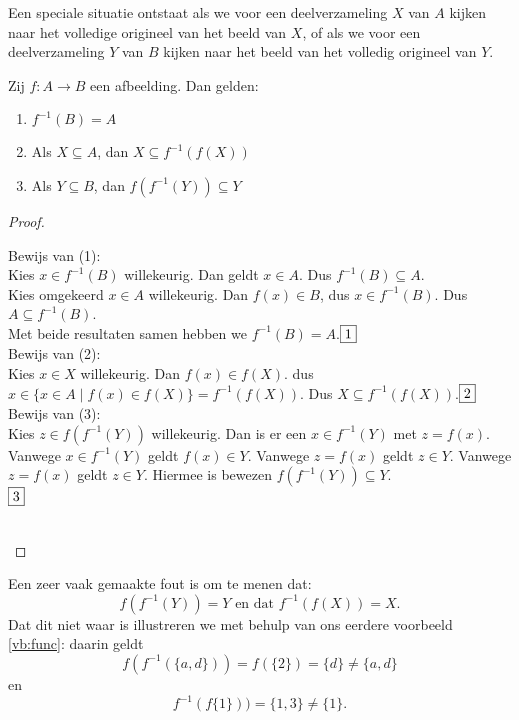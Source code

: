 Een speciale situatie ontstaat als we voor een deelverzameling $X$ van $A$ kijken naar het volledige origineel van het beeld van $X$, of als we voor een deelverzameling $Y$ van $B$ kijken naar het beeld van het volledig origineel van $Y$.
\begin{theorem}\label{st:afb}
Zij $f:A\rightarrow B$ een afbeelding. Dan gelden:
\begin{enumerate}
    \item $f^{-1}(B)=A$
    \item Als $X\subseteq A$, dan $X\subseteq f^{-1}(f(X))$
    \item Als $Y\subseteq B$, dan $f(f^{-1}(Y))\subseteq Y$
\end{enumerate}
\end{theorem}
\begin{proof}\mbox{}\\

\begin{minipage}{.9\textwidth}
Bewijs van (1):\\[1.5pt]
Kies $x\in f^{-1}(B)$ willekeurig. Dan geldt $x\in A$. Dus $f^{-1}(B)\subseteq A$.\\[1.5pt]
Kies omgekeerd $x\in A$ willekeurig. Dan $f(x)\in B$, dus $x\in f^{-1}(B)$. Dus $A\subseteq f^{-1}(B)$.\\[1.5pt]
Met beide resultaten samen hebben we $f^{-1}(B)=A$.\hfill$\fbox{1}$\\[2.5pt]
Bewijs van (2):\\[1.5pt]
Kies $x\in X$ willekeurig. Dan $f(x)\in f(X)$. dus $x\in\{x\in A\;|\;f(x)\in f(X)\} = f^{-1}(f(X))$. Dus $X\subseteq f^{-1}(f(X))$.\hfill$\fbox{2}$\\[2.5pt]
Bewijs van (3):\\[1.5pt]
Kies $z\in f(f^{-1}(Y))$ willekeurig. Dan is er een $x\in f^{-1}(Y)$ met $z=f(x)$. Vanwege $x\in f^{-1}(Y)$ geldt $f(x)\in Y$. Vanwege $z=f(x)$ geldt $z\in Y$. Vanwege $z=f(x)$ geldt $z\in Y$. Hiermee is bewezen $f(f^{-1}(Y))\subseteq Y$.\\ \mbox{}\hfill$\fbox{3}$
\end{minipage}\\
\end{proof}

Een zeer vaak gemaakte fout is om te menen dat:
$$f(f^{-1}(Y)) = Y\text{ en dat } f^{-1}(f(X)) = X.$$
Dat dit niet waar is illustreren we met behulp van ons eerdere voorbeeld \ref{vb:func}: daarin geldt
$$f(f^{-1}(\{a,d\})) = f(\{2\}) = \{d\}\not = \{a,d\}$$
en
$$f^{-1}(f\{1\})) = \{1, 3\}\not=\{1\}.$$

